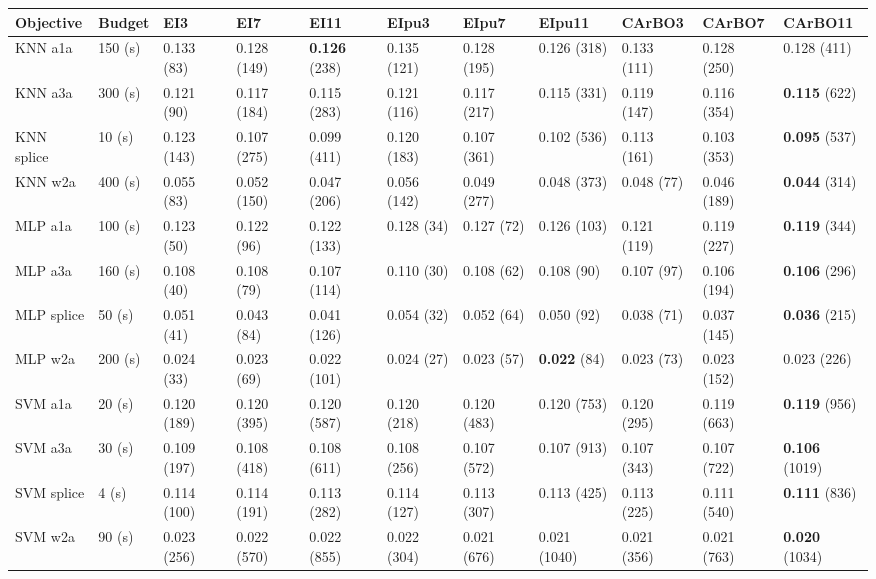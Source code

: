 \documentclass{article}
\begin{document}
\begin{table}[ht]
\centering 
\scriptsize
\setlength\tabcolsep{4pt}
\begin{tabular}{ | l  l  l l l l l l l l l | }
\hline 
Objective & Budget & EI3 & EI7 & EI11 & EIpu3 & EIpu7 & EIpu11 & CArBO3 & CArBO7 & CArBO11 \\
\hline \hline
KNN a1a 	& 150 (s) &    0.133 (83) & 0.128 (149) & \textbf{0.126} (238) & 0.135 (121) & 0.128 (195) & 0.126 (318) & 0.133 (111) & 0.128 (250) & 0.128 (411) \\\hline
KNN a3a 	& 300 (s) &    0.121 (90) & 0.117 (184) & 0.115 (283) & 0.121 (116) & 0.117 (217) & 0.115 (331) & 0.119 (147) & 0.116 (354) & \textbf{0.115} (622) \\\hline
KNN splice 	& 10 (s)  & 0.123 (143) & 0.107 (275) & 0.099 (411) & 0.120 (183) & 0.107 (361) & 0.102 (536) & 0.113 (161) & 0.103 (353) & \textbf{0.095} (537) \\\hline
KNN w2a 	& 400 (s) &    0.055 (83) & 0.052 (150) & 0.047 (206) & 0.056 (142) & 0.049 (277) & 0.048 (373) & 0.048 (77) & 0.046 (189) & \textbf{0.044} (314) \\\hline
MLP a1a 	& 100 (s)  &    0.123 (50) & 0.122 (96) & 0.122 (133) & 0.128 (34) & 0.127 (72) & 0.126 (103) & 0.121 (119) & 0.119 (227) & \textbf{0.119} (344) \\\hline
MLP a3a 	& 160 (s)  &    0.108 (40) & 0.108 (79) & 0.107 (114) & 0.110 (30) & 0.108 (62) & 0.108 (90) & 0.107 (97) & 0.106 (194) & \textbf{0.106} (296) \\\hline
MLP splice 	& 50 (s)  & 0.051 (41) & 0.043 (84) & 0.041 (126) & 0.054 (32) & 0.052 (64) & 0.050 (92) & 0.038 (71) & 0.037 (145) &\textbf{ 0.036} (215) \\\hline
MLP w2a 	& 200 (s) &    0.024 (33) & 0.023 (69) & 0.022 (101) & 0.024 (27) & 0.023 (57) & \textbf{0.022} (84) & 0.023 (73) & 0.023 (152) & 0.023 (226) \\\hline
SVM a1a 	& 20 (s)  &    0.120 (189) & 0.120 (395) & 0.120 (587) & 0.120 (218) & 0.120 (483) & 0.120 (753) & 0.120 (295) & 0.119 (663) & \textbf{0.119} (956) \\\hline
SVM a3a 	& 30 (s)  &    0.109 (197) & 0.108 (418) & 0.108 (611) & 0.108 (256) & 0.107 (572) & 0.107 (913) & 0.107 (343) & 0.107 (722) & \textbf{0.106} (1019) \\\hline
SVM splice 	& 4 (s)   & 0.114 (100) & 0.114 (191) & 0.113 (282) & 0.114 (127) & 0.113 (307) & 0.113 (425) & 0.113 (225) & 0.111 (540) & \textbf{0.111} (836) \\\hline
SVM w2a 	& 90 (s)  &    0.023 (256) & 0.022 (570) & 0.022 (855) & 0.022 (304) & 0.021 (676) & 0.021 (1040) & 0.021 (356) & 0.021 (763) & \textbf{0.020} (1034) \\\hline

\end{tabular}
\end{table}
\end{document}
